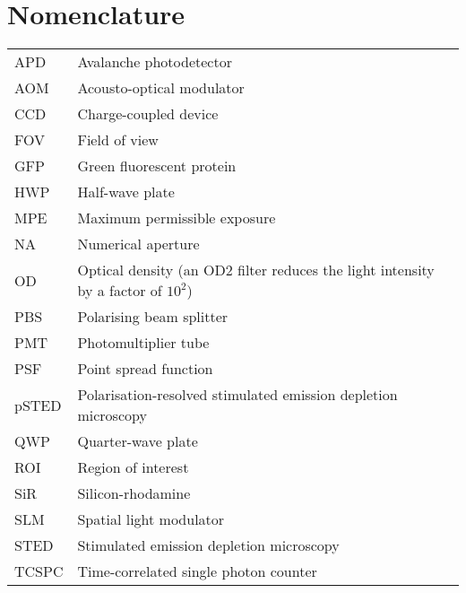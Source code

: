 \chapter{Nomenclature}

\begin{tabular}{ll}
	APD   & Avalanche photodetector                                                              \\
	AOM   & Acousto-optical modulator                                                            \\
	CCD   & Charge-coupled device                                                                \\
	FOV   & Field of view                                                                        \\
	GFP   & Green fluorescent protein                                                            \\
	HWP   & Half-wave plate                                                                      \\
	MPE   & Maximum permissible exposure                                                         \\
	NA    & Numerical aperture                                                                   \\
	OD    & Optical density  (an OD2 filter reduces the light intensity by a factor of $ 10^2 $) \\
	PBS   & Polarising beam splitter                                                             \\
	PMT   & Photomultiplier tube                                                                 \\
	PSF   & Point spread function                                                                \\
	pSTED & Polarisation-resolved stimulated emission depletion microscopy                       \\
	QWP   & Quarter-wave plate                                                                   \\
	ROI   & Region of interest                                                                   \\
	SiR   & Silicon-rhodamine                                                                    \\
	SLM   & Spatial light modulator                                                              \\
	STED  & Stimulated emission depletion  microscopy                                            \\
	TCSPC & Time-correlated single photon counter
\end{tabular}